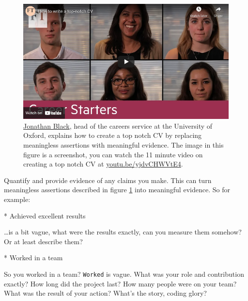 \documentclass[
]{book}
\newenvironment{Shaded}{\begin{snugshade}}{\end{snugshade}}
\newcommand{\NormalTok}[1]{#1}
\newcommand{\SpecialStringTok}[1]{\textcolor[rgb]{0.31,0.60,0.02}{#1}}
\begin{document}
\begin{figure}

{\centering \includegraphics[width=0.99\linewidth]{images/youtube-jonathan-black} 

}

\caption{\href{https://twitter.com/jonathanpblack}{Jonathan Black}, head of the careers service at the University of Oxford, explains how to create a top notch CV by replacing meaningless assertions with meaningful evidence. \citep{topnotchcv} The image in this figure is a screenshot, you can watch the 11 minute video on creating a top notch CV at \href{https://youtu.be/yjdvCHWVtE4}{youtu.be/yjdvCHWVtE4}.}\label{fig:black-fig}
\end{figure}



Quantify and provide evidence of any claims you make. This can turn meaningless assertions described in figure \ref{fig:black-fig} into meaningful evidence. So for example:

\begin{Shaded}
\begin{Highlighting}[]
\SpecialStringTok{* }\NormalTok{Achieved excellent results}
\end{Highlighting}
\end{Shaded}

\ldots is a bit vague, what were the results exactly, can you measure them somehow? Or at least describe them?

\begin{Shaded}
\begin{Highlighting}[]
\SpecialStringTok{* }\NormalTok{Worked in a team}
\end{Highlighting}
\end{Shaded}

So you worked in a team? \texttt{Worked} is vague. What was your role and contribution exactly? How long did the project last? How many people were on your team? What was the result of your action? What's the story, coding glory? \citep{whatsthestory}
\end{document}
